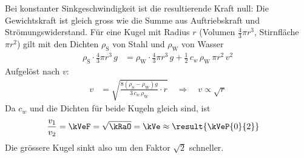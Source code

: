 Bei konstanter Sinkgeschwindigkeit ist die resultierende Kraft null: Die Gewichtskraft ist gleich gross wie die Summe aus Auftriebskraft und Strömungswiderstand. Für eine Kugel mit Radius $r$ (Volumen $\frac{4}{3}\pi r^3$, Stirnfläche $\pi r^2$) gilt mit den Dichten $\rho_\text{S}$ von Stahl und $\rho_\text{W}$ von Wasser
\begin{align}
 \rho_\text{S}\cdot\frac{4}{3}\pi r^3\,g &= \rho_\text{W}\cdot\frac{4}{3}\pi r^3\,g + \frac{1}{2}\,c_w\,\rho_\text{W}\,\pi r^2\,v^2
\end{align}
Aufgelöst nach $v$:
\begin{align}
 v &= \sqrt{\frac{8\left(\rho_\text{S}-\rho_\text{W}\right)g}{3\,c_w\,\rho_\text{W}}\cdot r} \quad\Rightarrow\quad v \propto \sqrt{r}
\end{align}
Da $c_w$ und die Dichten für beide Kugeln gleich sind, ist
\begin{align}
 \frac{v_1}{v_2} &= \kVeF = \sqrt{\kRaO} = \kVe \approx \result{\kVeP{0}{2}}
\end{align}
Die grössere Kugel sinkt also um den Faktor $\sqrt{2}$ schneller.
